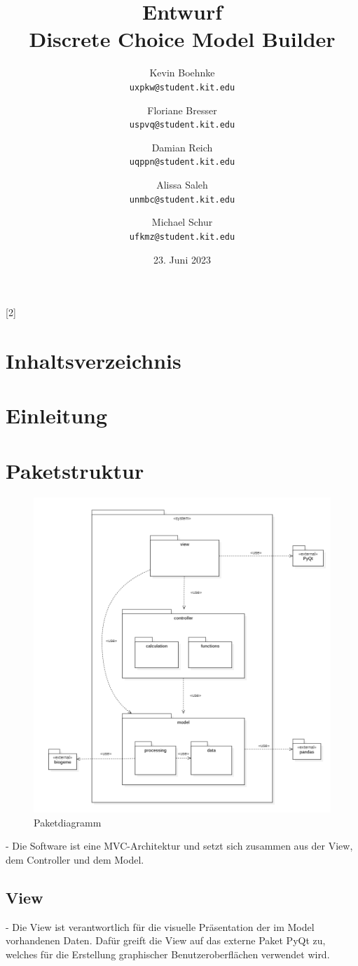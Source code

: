\documentclass{article}
\title{Entwurf \\ \large Discrete Choice Model Builder}
\author{Kevin Boehnke \\ \texttt{uxpkw@student.kit.edu}
\and Floriane Bresser \\ \texttt{uspvq@student.kit.edu}
\and Damian Reich \\ \texttt{uqppn@student.kit.edu}
\and Alissa Saleh \\ \texttt{unmbc@student.kit.edu}
\and Michael Schur \\ \texttt{ufkmz@student.kit.edu}}
\date{23. Juni 2023}
\begin{document}
\maketitle
\newpage
\startcontents[maintableofcontents]
[2]{\section*{Inhaltsverzeichnis}}
\thispagestyle{empty}
\newpage
{}

\section{Einleitung}


\section{Paketstruktur}
\begin{figure}[H]%
    \centering
    \includegraphics[width=13cm]{img/PackageDiagram.png}
    \caption{Paketdiagramm}
\end{figure}

- Die Software ist eine MVC-Architektur und setzt sich zusammen aus der View, dem Controller und dem Model.
\subsection{View}
- Die View ist verantwortlich für die visuelle Präsentation der im Model vorhandenen Daten. Dafür greift die View auf das externe Paket PyQt zu, welches für die Erstellung graphischer Benutzeroberflächen verwendet wird.
\end{document}
